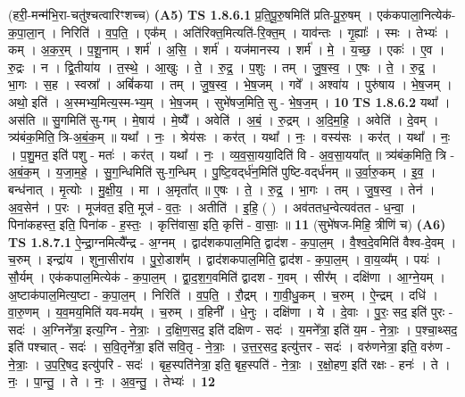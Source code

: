 \documentclass[17pt]{extarticle}
\begin{document}
                  \newline
                       (हरी॒-मन्म॑भि॒रा-चतु॑श्चत्वारिꣳशच्च)  \textbf{(A5)} \newline \newline
                                \textbf{ TS 1.8.6.1} \newline
                  प्र॒ति॒पू॒रु॒षमिति॑ प्रति-पू॒रु॒षम् । एक॑कपाला॒नित्येक॑-क॒पा॒ला॒न् । निरिति॑ । व॒प॒ति॒ । एक᳚म् । अति॑रिक्त॒मित्यति॑-रि॒क्त॒म् । याव॑न्तः । गृ॒ह्याः᳚ । स्मः । तेभ्यः॑ । कम् । अ॒क॒र॒म् । प॒शू॒नाम् । शर्म॑ । अ॒सि॒ । शर्म॑ । यज॑मानस्य । शर्म॑ । मे॒ । य॒च्छ॒ । एकः॑ । ए॒व । रु॒द्रः । न । द्वि॒तीया॑य । त॒स्थे॒ । आ॒खुः । ते॒ । रु॒द्र॒ । प॒शुः । तम् । जु॒ष॒स्व॒ । ए॒षः । ते॒ । रु॒द्र॒ । भा॒गः । स॒ह । स्वस्रा᳚ । अबिं॑कया । तम् । जु॒ष॒स्व॒ । भे॒ष॒जम् । गवे᳚ । अश्वा॑य । पुरु॑षाय । भे॒ष॒जम् । अथो॒ इति॑ । अ॒स्मभ्य॒मित्य॒स्म-भ्य॒म् । भे॒ष॒जम् । सुभे॑षज॒मिति॒ सु - भे॒ष॒ज॒म् । \textbf{  10} \newline
                  \newline
                                \textbf{ TS 1.8.6.2} \newline
                  यथा᳚ । अस॑ति ॥ सु॒गमिति॑ सु-गम् । मे॒षाय॑ । मे॒ष्यै᳚ । अवेति॑ । अ॒बं॒ । रु॒द्रम् । अ॒दि॒म॒हि॒ । अवेति॑ । दे॒वम् । त्र्य॑बंक॒मिति॒ त्रि-अ॒बं॒क॒म् ॥ यथा᳚ । नः॒ । श्रेय॑सः । कर॑त् । यथा᳚ । नः॒ । वस्य॑सः । कर॑त् । यथा᳚ । नः॒ । प॒शु॒मत॒ इति॑ पशु - मतः॑ । कर॑त् । यथा᳚ । नः॒ । व्य॒व॒सा॒यया॒दिति॑ वि - अ॒व॒सा॒यया᳚त् ॥ त्र्य॑बंक॒मिति॒ त्रि - अ॒बं॒क॒म् । य॒जा॒म॒हे॒ । सु॒ग॒न्धिमिति॑ सु-ग॒न्धिम् । पु॒ष्टि॒वद्‌र्ध॑न॒मिति॑ पुष्टि-वद्‌र्ध॑नम् ॥ उ॒र्वा॒रु॒कम् । इ॒व॒ । बन्ध॑नात् । मृ॒त्योः । मु॒क्षी॒य॒ । मा । अ॒मृता᳚त् ॥ ए॒षः । ते॒ । रु॒द्र॒ । भा॒गः । तम् । जु॒ष॒स्व॒ । तेन॑ । अ॒व॒सेन॑ । प॒रः । मूज॑वत॒ इति॒ मूज॑ - व॒तः॒ । अतीति॑ । इ॒हि॒ ( ) । अव॑ततध॒न्वेत्यव॑तत - ध॒न्वा॒ । पिना॑कहस्त॒ इति॒ पिना॑क - ह॒स्तः॒ । कृत्ति॑वासा॒ इति॒ कृत्ति॑ - वा॒साः॒ ॥ \textbf{  11 } \newline
                  \newline
                      (सुभे॑षज-मिहि॒ त्रीणि॑ च)  \textbf{(A6)} \newline \newline
                                \textbf{ TS 1.8.7.1} \newline
                  ऐ॒न्द्रा॒ग्नमित्यै᳚न्द्र - अ॒ग्नम् । द्वाद॑शकपाल॒मिति॒ द्वाद॑श - क॒पा॒ल॒म् । वै॒श्व॒दे॒वमिति॑ वैश्व-दे॒वम् । च॒रुम् । इन्द्रा॑य । शुना॒सीरा॑य । पु॒रो॒डाश᳚म् । द्वाद॑शकपाल॒मिति॒ द्वाद॑श - क॒पा॒ल॒म् । वा॒य॒व्य᳚म् । पयः॑ । सौ॒र्यम् । एक॑कपाल॒मित्येक॑ - क॒पा॒ल॒म् । द्वा॒द॒श॒ग॒वमिति॑ द्वादश - ग॒वम् । सीर᳚म् । दक्षि॑णा । आ॒ग्ने॒यम् । अ॒ष्टाक॑पाल॒मित्य॒ष्टा - क॒पा॒ल॒म् । निरिति॑ । व॒प॒ति॒ । रौ॒द्रम् । गा॒वी॒धु॒कम् । च॒रुम् । ऐ॒न्द्रम् । दधि॑ । वा॒रु॒णम् । य॒व॒मय॒मिति॑ यव-मय᳚म् । च॒रुम् । व॒हिनी᳚ । धे॒नुः । दक्षि॑णा । ये । दे॒वाः । पु॒रः॒ सद॒ इति॑ पुरः - सदः॑ । अ॒ग्निने᳚त्रा॒ इत्य॒ग्नि - ने॒त्राः॒ । द॒क्षि॒ण॒सद॒ इति॑ दक्षिण - सदः॑ । य॒मने᳚त्रा॒ इति॑ य॒म - ने॒त्राः॒ । प॒श्चा॒थ्सद॒ इति॑ पश्चात् - सदः॑ । स॒वि॒तृने᳚त्रा॒ इति॑ सवि॒तृ - ने॒त्राः॒ । उ॒त्त॒र॒सद॒ इत्यु॑त्तर - सदः॑ । वरु॑णनेत्रा॒ इति॒ वरु॑ण - ने॒त्राः॒ । उ॒प॒रि॒षद॒ इत्यु॑परि - सदः॑ । बृह॒स्पति॑नेत्रा॒ इति॒ बृह॒स्पति॑ - ने॒त्राः॒ । र॒क्षो॒हण॒ इति॑ रक्षः - हनः॑ । ते । नः॒ । पा॒न्तु॒ । ते । नः॒ । अ॒व॒न्तु॒ । तेभ्यः॑ । \textbf{  12} \newline
\end{document}
